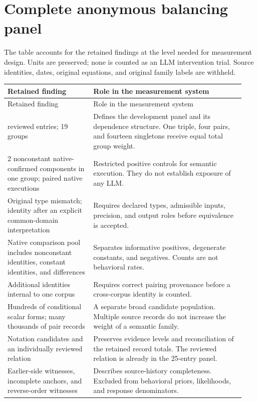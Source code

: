 \documentclass[11pt,letterpaper]{article}
\theoremstyle{definition}\newtheorem{definition}[theorem]{Definition}
\begin{document}
\section{Complete anonymous balancing panel}\label{app:panel}
The table accounts for the retained findings at the level needed for measurement design. Units are preserved; none is counted as an LLM intervention trial. Source identities, dates, original equations, and original family labels are withheld.
\small
\begin{longtable}{p{0.34\linewidth}p{0.60\linewidth}}
\toprule
Retained finding & Role in the measurement system\\\midrule
\endfirsthead
\toprule Retained finding & Role in the measurement system\\\midrule
\endhead
\bottomrule\endfoot
25 reviewed entries; 19 groups & Defines the development panel and its dependence structure. One triple, four pairs, and fourteen singletons receive equal total group weight.\\[4pt]
2 nonconstant native-confirmed components in one group; paired native executions & Restricted positive controls for semantic execution. They do not establish exposure of any LLM.\\[4pt]
Original type mismatch; identity after an explicit common-domain interpretation & Requires declared types, admissible inputs, precision, and output roles before equivalence is accepted.\\[4pt]
Native comparison pool includes nonconstant identities, constant identities, and differences & Separates informative positives, degenerate constants, and negatives. Counts are not behavioral rates.\\[4pt]
Additional identities internal to one corpus & Requires correct pairing provenance before a cross-corpus identity is counted.\\[4pt]
Hundreds of conditional scalar forms; many thousands of pair records & A separate broad candidate population. Multiple source records do not increase the weight of a semantic family.\\[4pt]
Notation candidates and an individually reviewed relation & Preserves evidence levels and reconciliation of the retained record totals. The reviewed relation is already in the 25-entry panel.\\[4pt]
Earlier-side witnesses, incomplete anchors, and reverse-order witnesses & Describes source-history completeness. Excluded from behavioral priors, likelihoods, and response denominators.\\[4pt]

\end{longtable}
\end{document}
